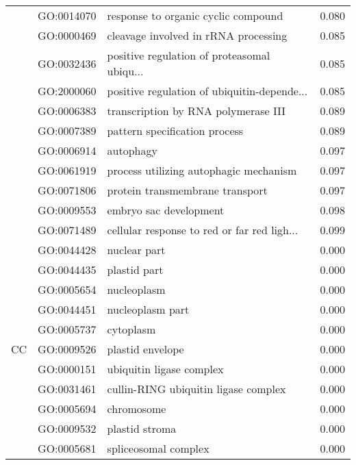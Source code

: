 \begin{longtable}{lllr}
   & GO:0014070 &          response to organic cyclic compound &         0.080 \\
   & GO:0000469 &         cleavage involved in rRNA processing &         0.085 \\
   & GO:0032436 &  positive regulation of proteasomal ubiqu... &         0.085 \\
   & GO:2000060 &  positive regulation of ubiquitin-depende... &         0.085 \\
   & GO:0006383 &          transcription by RNA polymerase III &         0.089 \\
   & GO:0007389 &                pattern specification process &         0.089 \\
   & GO:0006914 &                                    autophagy &         0.097 \\
   & GO:0061919 &       process utilizing autophagic mechanism &         0.097 \\
   & GO:0071806 &              protein transmembrane transport &         0.097 \\
   & GO:0009553 &                       embryo sac development &         0.098 \\
   & GO:0071489 &  cellular response to red or far red ligh... &         0.099 \\
\cline{1-4}
\multirow{72}{*}{CC} & GO:0044428 &                                 nuclear part &         0.000 \\
   & GO:0044435 &                                 plastid part &         0.000 \\
   & GO:0005654 &                                  nucleoplasm &         0.000 \\
   & GO:0044451 &                             nucleoplasm part &         0.000 \\
   & GO:0005737 &                                    cytoplasm &         0.000 \\
   & GO:0009526 &                             plastid envelope &         0.000 \\
   & GO:0000151 &                     ubiquitin ligase complex &         0.000 \\
   & GO:0031461 &         cullin-RING ubiquitin ligase complex &         0.000 \\
   & GO:0005694 &                                   chromosome &         0.000 \\
   & GO:0009532 &                               plastid stroma &         0.000 \\
   & GO:0005681 &                         spliceosomal complex &         0.000 \\

\end{longtable}
